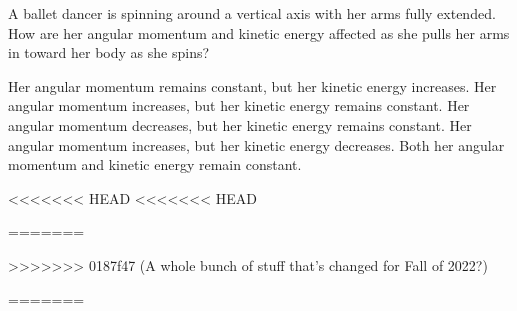\documentclass{../../oss-apphys-exam}
\begin{document}
\begin{multicols*}{2}
\begin{questions}
    \question A ballet dancer is spinning around a vertical axis with her arms
    fully extended. How are her angular momentum and kinetic energy affected
    as she pulls her arms in toward her body as she spins?
    \begin{choices}
      \choice Her angular momentum remains constant, but her kinetic energy
      increases.
      \choice Her angular momentum increases, but her kinetic energy remains
      constant.
      \choice Her angular momentum decreases, but her kinetic energy remains
      constant.
      \choice Her angular momentum increases, but her kinetic energy decreases.
      \choice Both her angular momentum and kinetic energy remain constant.
    \end{choices}
<<<<<<< HEAD
<<<<<<< HEAD

=======
    \vspace{.7in}
    
>>>>>>> 0187f47 (A whole bunch of stuff that's changed for Fall of 2022?)
    
=======
    \vspace{.7in}
    

\end{questions}
\end{multicols*}
\end{document}
